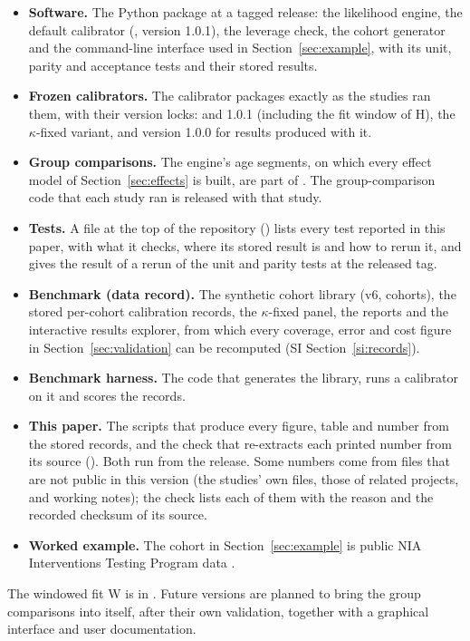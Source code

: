 \begin{itemize}[leftmargin=1.5em,itemsep=1pt]
  \item \textbf{Software.} The  Python package at a tagged release: the likelihood engine, the default
    calibrator (, version 1.0.1), the leverage check, the cohort generator and the command-line
    interface used in Section~\ref{sec:example}, with its unit, parity and acceptance tests and their stored results.
  \item \textbf{Frozen calibrators.} The calibrator packages exactly as the studies ran them, with their version locks:
     and  1.0.1 (including the fit window of H), the $\kappa$-fixed
    variant, and version 1.0.0 for results produced with it.
  \item \textbf{Group comparisons.} The engine's age segments, on which every effect model of
    Section~\ref{sec:effects} is built, are part of . The group-comparison code that each study ran is
    released with that study.
  \item \textbf{Tests.} A file at the top of the repository () lists every test reported in this paper,
    with what it checks, where its stored result is and how to rerun it, and gives the result of a rerun of the
     unit and parity tests at the released tag.
  \item \textbf{Benchmark (data record).} The synthetic cohort library (v6,  cohorts), the stored
    per-cohort calibration records, the $\kappa$-fixed panel, the reports and the interactive results explorer, from
    which every coverage, error and cost figure in Section~\ref{sec:validation} can be recomputed (SI
    Section~\ref{si:records}).
  \item \textbf{Benchmark harness.} The code that generates the library, runs a calibrator on it and scores the records.
  \item \textbf{This paper.} The scripts that produce every figure, table and number from the stored records, and the
    check that re-extracts each printed number from its source (). Both run from the release.
    Some numbers come from files that are not public in this version (the studies' own files, those of related
    projects, and working notes); the check lists each of them with the reason and the recorded checksum of its source.
  \item \textbf{Worked example.} The cohort in Section~\ref{sec:example} is public NIA Interventions Testing Program
    data \citep{nadon2008design}.
\end{itemize}
The windowed fit W is in . Future versions are planned to bring the group comparisons into 
itself, after their own validation, together with a graphical interface and user documentation.
